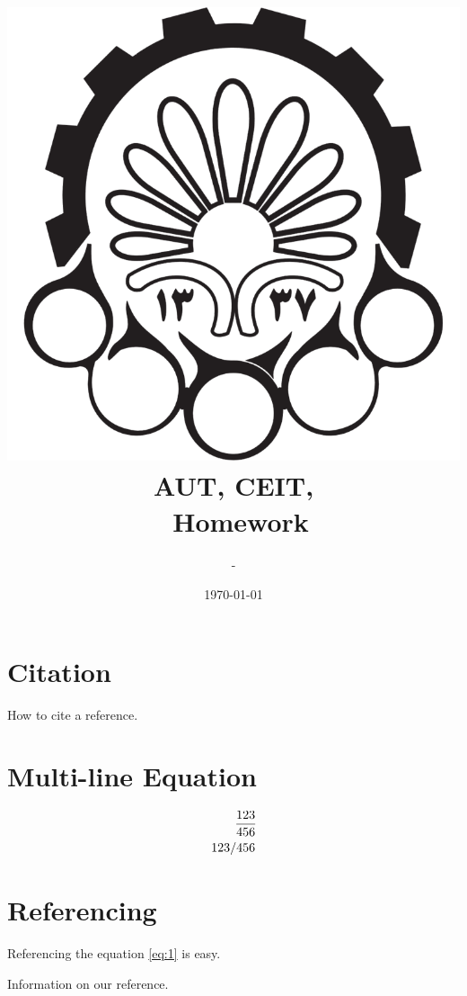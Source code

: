 \documentclass[a4paper]{article}
\title{
	\includegraphics{aut-logo.png}\\
	AUT, CEIT, \course \\
	\numofhw\ Homework
}
\author{\writer\ -\ \stdnum}
\date{\today}
\begin{document}
	
	\maketitle
	\thispagestyle{empty}
	\tableofcontents
	\pagebreak
	

\section{Citation}

How to cite a reference. \cite{refrence-label}

\section{Multi-line Equation}

\begin{equation}
	\label{eq:1}
	\begin{aligned}
		\frac{123}{456} \\
		\left.123\middle/456\right.
	\end{aligned}
\end{equation}

\section{Referencing}

Referencing the equation \ref{eq:1} is easy.

\begin{thebibliography}{99}
	
	Information on our reference.
	
\end{thebibliography}
\end{document}
